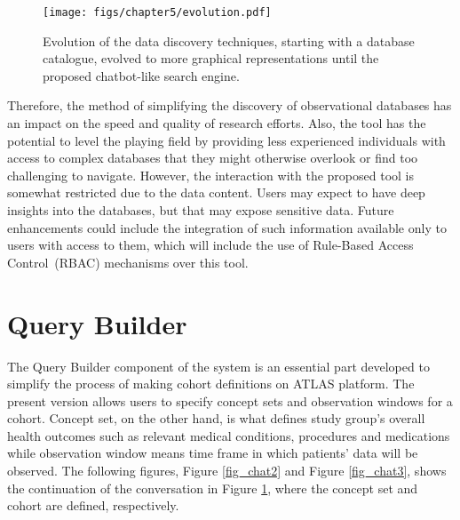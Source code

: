 \begin{figure}[H]
    \texttt{[image: figs/chapter5/evolution.pdf]}
    \centering
	\caption{Evolution of the data discovery techniques, starting with a database catalogue, evolved to more graphical representations until the proposed chatbot-like search engine.}
    \label{fig_chat1}
\end{figure}


Therefore, the method of simplifying the discovery of observational databases has an impact on the speed and quality of research efforts. Also, the tool has the potential to level the playing field by providing less experienced individuals with access to complex databases that they might otherwise overlook or find too challenging to navigate. However, the interaction with the proposed tool is somewhat restricted due to the data content. Users may expect to have deep insights into the databases, but that may expose sensitive data. Future enhancements could include the integration of such information available only to users with access to them, which will include the use of Rule-Based Access Control~(RBAC) mechanisms over this tool.



\section{Query Builder}



The Query Builder component of the system is an essential part developed to simplify the process of making cohort definitions on ATLAS platform. The present version allows users to specify concept sets and observation windows for a cohort. Concept set, on the other hand, is what defines study group's overall health outcomes such as relevant medical conditions, procedures and medications while observation window means time frame in which patients' data will be observed. The following figures, Figure \ref{fig_chat2} and Figure \ref{fig_chat3}, shows the continuation of the conversation in Figure \ref{fig_chat1}, where the concept set and cohort are defined, respectively.

